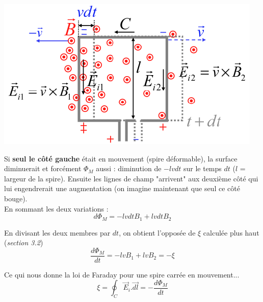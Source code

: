 \documentclass	[11pt, a4paper, openany]{book}
\begin{document}
\begin{center}
\includegraphics[scale=0.45]{em/image10.png}\\
\end{center}
Si \textbf{seul le côté gauche} était en mouvement (spire déformable), la surface diminuerait et forcément $\Phi_M$ aussi : diminution de $-lvdt$ sur le temps $dt$ ($l$ = largeur de la spire). Ensuite les lignes de champ "arrivent" aux deuxième côté qui lui engendrerait une augmentation (on imagine maintenant que seul ce côté bouge). \\
En sommant les deux variations : 
\begin{equation}
d\Phi_M = -lvdtB_1 + lvdtB_2
\end{equation}

En divisant les deux membres par $dt$, on obtient l'opposée de $\xi$ calculée plus haut (\textit{section 3.2})
\begin{equation}
\frac{d\Phi_M}{dt} = -lvB_1 + lvB_2 = - \xi
\end{equation}

Ce qui nous donne la loi de Faraday pour une spire carrée en  mouvement...
\begin{equation}
\xi = \oint_C \vec{E}_i.\vec{dl} = - \frac{d\Phi_M}{dt}
\end{equation}
\end{document}
